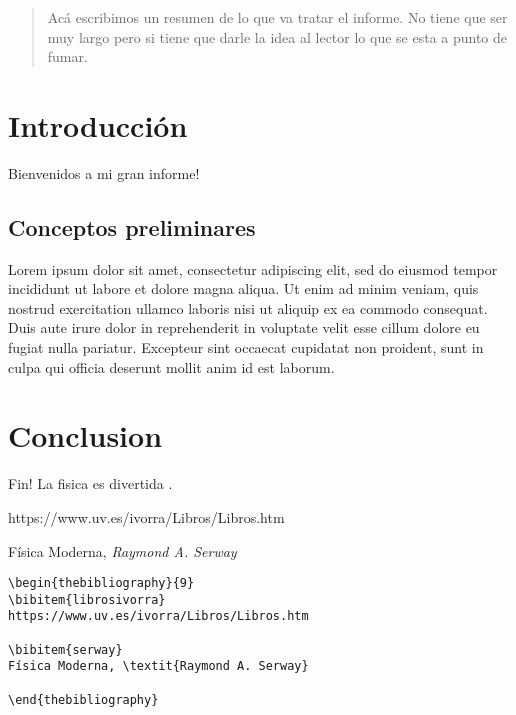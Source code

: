 \documentclass{article}
\begin{document}
\maketitle
\begin{abstract}
Acá escribimos un resumen de lo que va tratar el informe. No tiene que ser muy largo pero si tiene que darle la idea al lector lo que se esta a punto de fumar.
\end{abstract}
\section{Introducción}
Bienvenidos a mi gran informe!
\subsection{Conceptos preliminares}
Lorem ipsum dolor sit amet, consectetur adipiscing elit, sed do eiusmod tempor incididunt ut labore et dolore magna aliqua. Ut enim ad minim veniam, quis nostrud exercitation ullamco laboris nisi ut aliquip ex ea commodo consequat. Duis aute irure dolor in reprehenderit in voluptate velit esse cillum dolore eu fugiat nulla pariatur. Excepteur sint occaecat cupidatat non proident, sunt in culpa qui officia deserunt mollit anim id est laborum.
\section{Conclusion}
Fin! La fisica es divertida \cite{serway}.

\begin{thebibliography}{9}
https://www.uv.es/ivorra/Libros/Libros.htm

Física Moderna, \textit{Raymond A. Serway}

\end{thebibliography}


\begin{verbatim}
\begin{thebibliography}{9}
\bibitem{librosivorra}
https://www.uv.es/ivorra/Libros/Libros.htm

\bibitem{serway}
Física Moderna, \textit{Raymond A. Serway}

\end{thebibliography}
\end{verbatim}
\end{document}

